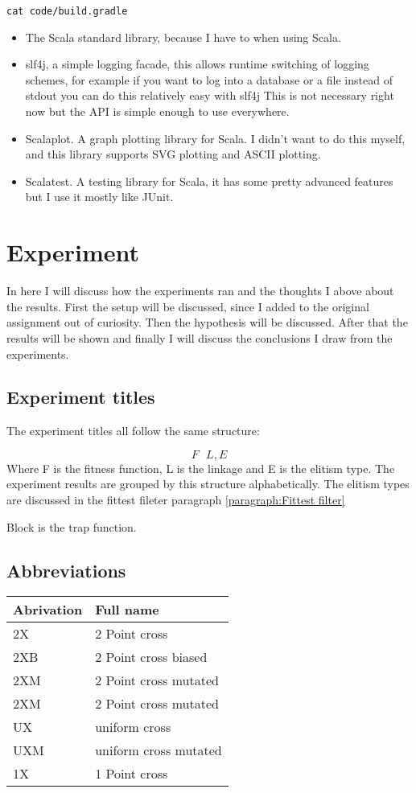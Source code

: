\documentclass{article}
\begin{document}
\begin{empfile}
\begin{lstlisting}[frame=single]
	cat code/build.gradle
\end{lstlisting}


\begin{itemize}
	\item The Scala standard library, because I have to when using Scala.
	\item slf4j, a simple logging facade, this allows runtime switching of
		logging schemes, for example if you want to log into a database or
		a file instead of stdout you can do this relatively easy with slf4j
		This is not necessary right now but the API is simple enough to use
		everywhere.
	\item Scalaplot. A graph plotting library for Scala. I didn't want to
		do this myself, and this library supports SVG plotting and ASCII
		plotting.
	\item Scalatest. A testing library for Scala, it has some pretty advanced
		features but I use it mostly like JUnit.
\end{itemize}

\section{Experiment}
In here I will discuss how the experiments ran and the thoughts I
above about the results.
First the setup will be discussed, since I added to the
original assignment out of curiosity. Then the hypothesis
will be discussed. After that the results will be shown
and finally I will discuss the conclusions I draw from the experiments.

\subsection{Experiment titles}
The experiment titles all follow the same structure:

\[F\mbox{ }L, E\]
Where F is the fitness function, L is the linkage and E is the elitism type.
The experiment results are grouped by this structure alphabetically.
The elitism types are discussed in the fittest fileter paragraph \ref{paragraph:Fittest filter}

Block is the trap function.

\subsection{Abbreviations}
\begin{tabular}{ll}
	Abrivation & Full name \\ \toprule
	2X & 2 Point cross \\
	2XB & 2 Point cross biased \\
	2XM & 2 Point cross mutated \\
	2XM & 2 Point cross mutated \\
	UX & uniform cross \\
	UXM & uniform cross mutated \\
	1X & 1 Point cross \\ \bottomrule
\end{tabular}


\end{empfile}
\end{document}
